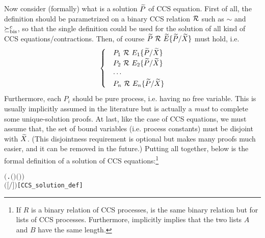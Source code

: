 Now consider (formally) what is a solution $\widetilde P$ of CCS equation. First of
all, the definition should be parametrized on a binary CCS
relation ${\cal R}$ such as $\sim$ and $\mathrel{\succeq^{\rm{c}}_{\rm{bis}}}$, so that the single definition
could be used for the solution of all kind of CCS
equations/contractions. Then, of course ${\widetilde P} \ {\cal R}\  {\widetilde E}\{\widetilde
P/\widetilde X\}$ must hold, i.e.
\begin{equation*}
  \begin{cases}
    &P_1 \ {\cal R}\ E_1\{\widetilde P/\widetilde X\} \\
    &P_2 \ {\cal R}\ E_2\{\widetilde P/\widetilde X\} \\
    & \cdots \\
    &P_n \ {\cal R}\ E_n\{\widetilde P/\widetilde X\}
  \end{cases}
\end{equation*}
Furthermore, each $P_i$ should be pure process, i.e. having no free
variable. This is usually implicitly assumed in the literature but is
actually a \emph{must} to complete some unique-solution proofs.
At last, like the case of CCS equations, we must assume that, the
set of bound variables (i.e. process constants) must be disjoint with
$\widetilde X$. (This disjointness requirement is optional but makes many proofs much
easier, and it can be removed in the future.) Putting all together,
below is the formal definition of a solution of \multivariate CCS
equations:\footnote{If $R$ is a binary relation of CCS processes,
   is the same binary relation but for lists of
  CCS processes. Furthermore,  implicitly
  implies that the two lists $A$ and $B$ have the same length.}
\begin{alltt}
   \HOLTokenTurnstile{}      \HOLSymConst{\HOLTokenEquiv{}}
        \HOLSymConst{\HOLTokenConj{}}  \ensuremath{(}\HOLTokenLambda{}.  \ensuremath{(} \ensuremath{)} \ensuremath{(} \ensuremath{)}\ensuremath{)}  \HOLSymConst{\HOLTokenConj{}}
         \ensuremath{(} \ensuremath{[}\ensuremath{/}\ensuremath{]} \ensuremath{)}\hfill{[CCS_solution_def]}
\end{alltt}
